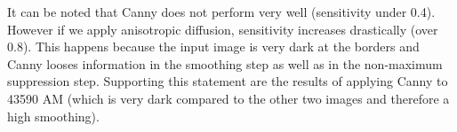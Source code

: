\documentclass{article}
\begin{document}
	It can be noted that Canny does not perform very well (sensitivity under 0.4).
	However if we apply anisotropic diffusion,
	sensitivity increases drastically (over 0.8). This happens because the input image
	is very dark at the borders and Canny looses information in the smoothing
	step as well as in the non-maximum suppression step. Supporting this statement
	are the results of applying Canny to 43590 AM (which is very dark compared to
	the other two images and therefore a high smoothing).
\end{document}

